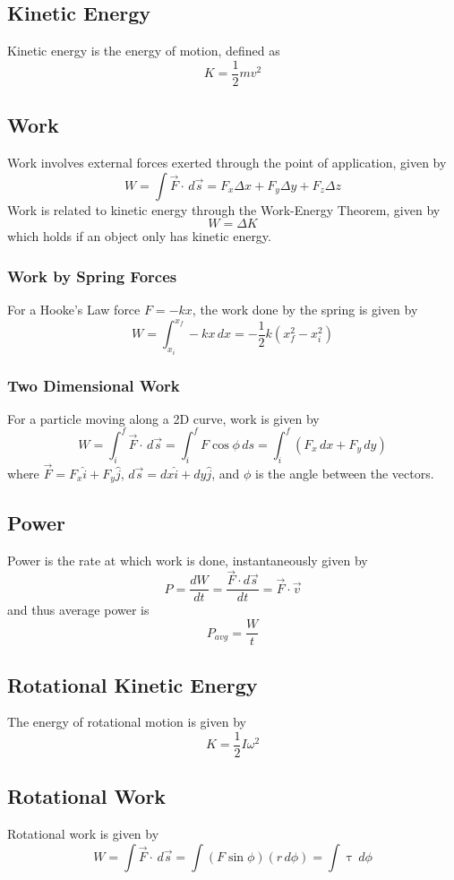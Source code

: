 \documentclass[../PhysicsFormulae]{subfiles}
\begin{document}
\subsection{Kinetic Energy}
Kinetic energy is the energy of motion, defined as 
\[ K = \frac{1}{2}mv^2 \]

\subsection{Work}
Work involves external forces exerted through the point of application, given by
\[ W = \int \vec{F} \cdot \,d\vec{s} = F_x \Delta x + F_y \Delta y + F_z \Delta z \]
Work is related to kinetic energy through the Work-Energy Theorem, given by
\[ W = \Delta K \]
which holds if an object only has kinetic energy.

\subsubsection{Work by Spring Forces}
For a Hooke's Law force $F=-kx$, the work done by the spring is given by
\[ W = \int_{x_i}^{x_f} -kx \,dx = -\frac{1}{2}k(x_f^2 - x_i^2) \]

\subsubsection{Two Dimensional Work}
For a particle moving along a 2D curve, work is given by
\[ W = \int_i^f \vec{F} \cdot \,d\vec{s} = \int_i^f F\cos{\phi} \,ds = \int_i^f (F_x \,dx + F_y \,dy) \]
where $\vec{F} = F_x \hat{i} + F_y \hat{j}$, $d\vec{s} = dx \hat{i} + dy \hat{j}$, and $\phi$ is the angle between the vectors.

\subsection{Power}
Power is the rate at which work is done, instantaneously given by
\[ P = \frac{dW}{dt} = \frac{\vec{F} \cdot d\vec{s}}{dt} = \vec{F} \cdot \vec{v} \]
and thus average power is 
\[ P_{avg} = \frac{W}{t} \]

\subsection{Rotational Kinetic Energy}
The energy of rotational motion is given by
\[ K = \frac{1}{2}I\omega^2 \]

\subsection{Rotational Work}
Rotational work is given by
\[ W = \int \vec{F} \cdot \,d\vec{s} = \int (F\sin{\phi}) (r\,d\phi) = \int \uptau \,d\phi \]
\end{document}
